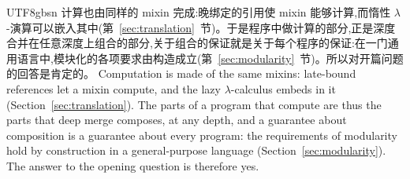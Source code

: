 \begin{CJK*}{UTF8}{gbsn}
\ifPaperChinese
计算也由同样的 mixin 完成:晚绑定的引用使 mixin 能够计算,而惰性 $\lambda$-演算可以嵌入其中(第~\ref{sec:translation}~节)。于是程序中做计算的部分,正是深度合并在任意深度上组合的部分,关于组合的保证就是关于每个程序的保证:在一门通用语言中,模块化的各项要求由构造成立(第~\ref{sec:modularity}~节)。所以对开篇问题的回答是肯定的。
\else
Computation is made of the same mixins: late-bound references let a mixin compute, and the lazy
$\lambda$-calculus embeds in it (Section~\ref{sec:translation}).
The parts of a program that compute are thus the parts that deep merge composes, at any depth, and a
guarantee about composition is a guarantee about every program: the requirements of modularity hold by
construction in a general-purpose language (Section~\ref{sec:modularity}).
The answer to the opening question is therefore yes.
\fi


\end{CJK*}
